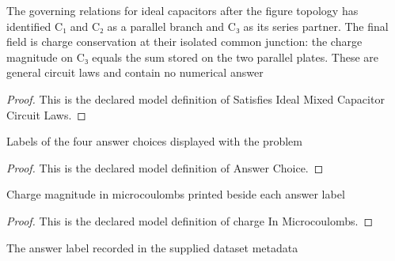 \begin{definition}
  \label{def:physics:phyx-mini-0880:phyxminiproblems-problemphyxmini0880-satisfiesidealmixedcapacitorcircuitlaws}
  The governing relations for ideal capacitors after the figure topology has identified C₁ and C₂ as a parallel branch and C₃ as its series partner. The final field is charge conservation at their isolated common junction: the charge magnitude on C₃ equals the sum stored on the two parallel plates. These are general circuit laws and contain no numerical answer
\end{definition}
\begin{proof}
  This is the declared model definition of Satisfies Ideal Mixed Capacitor Circuit Laws.
\end{proof}
\begin{definition}
  \label{def:physics:phyx-mini-0880:phyxminiproblems-problemphyxmini0880-answerchoice}
  Labels of the four answer choices displayed with the problem
\end{definition}
\begin{proof}
  This is the declared model definition of Answer Choice.
\end{proof}
\begin{definition}
  \label{def:physics:phyx-mini-0880:phyxminiproblems-problemphyxmini0880-answerchoice-chargeinmicrocoulombs}
  Charge magnitude in microcoulombs printed beside each answer label
\end{definition}
\begin{proof}
  This is the declared model definition of charge In Microcoulombs.
\end{proof}
\begin{definition}
  \label{def:physics:phyx-mini-0880:phyxminiproblems-problemphyxmini0880-recordeddatasetanswer}
  The answer label recorded in the supplied dataset metadata
\end{definition}
